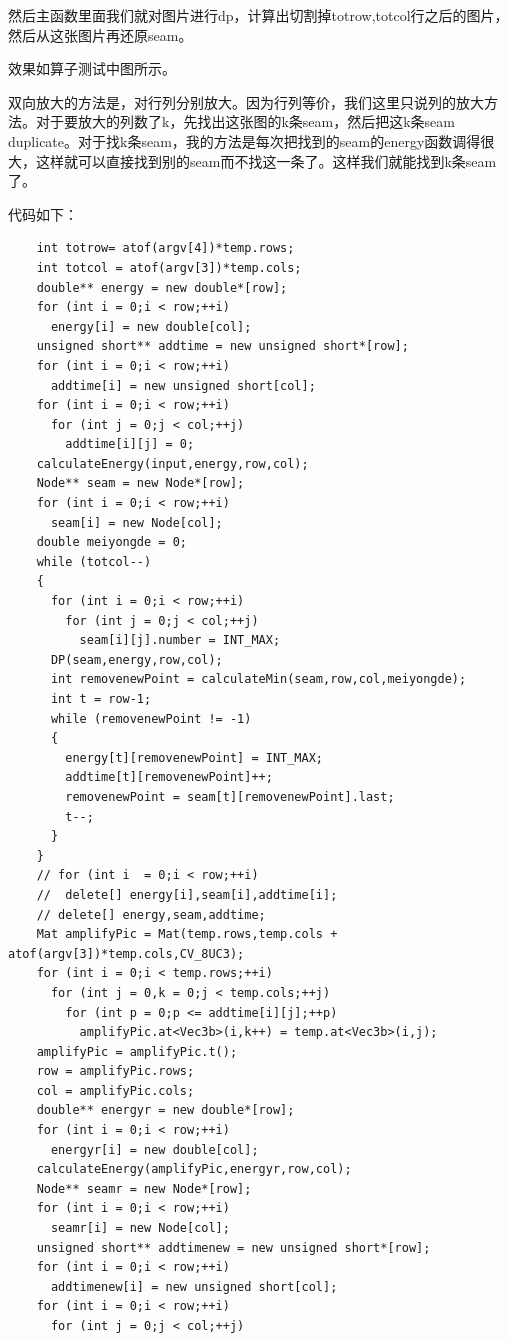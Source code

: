 \documentclass[10pt, a4paper]{article}
\begin{document}
    然后主函数里面我们就对图片进行dp，计算出切割掉totrow,totcol行之后的图片，然后从这张图片再还原seam。

    效果如算子测试中图所示。

    双向放大的方法是，对行列分别放大。因为行列等价，我们这里只说列的放大方法。对于要放大的列数了k，先找出这张图的k条seam，然后把这k条seam duplicate。对于找k条seam，我的方法是每次把找到的seam的energy函数调得很大，这样就可以直接找到别的seam而不找这一条了。这样我们就能找到k条seam了。

    代码如下：
    \begin{lstlisting}
    int totrow= atof(argv[4])*temp.rows;
    int totcol = atof(argv[3])*temp.cols;
    double** energy = new double*[row];
    for (int i = 0;i < row;++i)
      energy[i] = new double[col];
    unsigned short** addtime = new unsigned short*[row];
    for (int i = 0;i < row;++i)
      addtime[i] = new unsigned short[col];
    for (int i = 0;i < row;++i)
      for (int j = 0;j < col;++j)
        addtime[i][j] = 0;
    calculateEnergy(input,energy,row,col);
    Node** seam = new Node*[row];
    for (int i = 0;i < row;++i)
      seam[i] = new Node[col];
    double meiyongde = 0;
    while (totcol--)
    {
      for (int i = 0;i < row;++i)
        for (int j = 0;j < col;++j)
          seam[i][j].number = INT_MAX;
      DP(seam,energy,row,col);
      int removenewPoint = calculateMin(seam,row,col,meiyongde);
      int t = row-1;
      while (removenewPoint != -1)
      {
        energy[t][removenewPoint] = INT_MAX;
        addtime[t][removenewPoint]++;
        removenewPoint = seam[t][removenewPoint].last;
        t--;
      }
    }
    // for (int i  = 0;i < row;++i)
    //  delete[] energy[i],seam[i],addtime[i];
    // delete[] energy,seam,addtime;
    Mat amplifyPic = Mat(temp.rows,temp.cols + atof(argv[3])*temp.cols,CV_8UC3);
    for (int i = 0;i < temp.rows;++i)
      for (int j = 0,k = 0;j < temp.cols;++j)
        for (int p = 0;p <= addtime[i][j];++p)
          amplifyPic.at<Vec3b>(i,k++) = temp.at<Vec3b>(i,j);
    amplifyPic = amplifyPic.t();
    row = amplifyPic.rows;
    col = amplifyPic.cols;
    double** energyr = new double*[row];
    for (int i = 0;i < row;++i)
      energyr[i] = new double[col];
    calculateEnergy(amplifyPic,energyr,row,col);
    Node** seamr = new Node*[row];
    for (int i = 0;i < row;++i)
      seamr[i] = new Node[col];
    unsigned short** addtimenew = new unsigned short*[row];
    for (int i = 0;i < row;++i)
      addtimenew[i] = new unsigned short[col];
    for (int i = 0;i < row;++i)
      for (int j = 0;j < col;++j)

\end{lstlisting}
\end{document}
